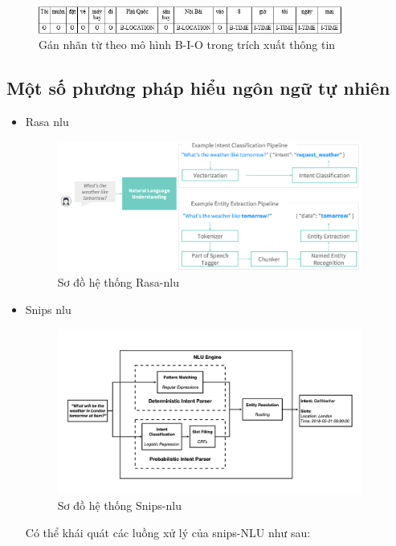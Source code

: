 \begin{figure}[htp]
    \centering
    \includegraphics[width=10cm]{images/Model-BIO.png}
    \caption{Gán nhãn từ theo mô hình B-I-O trong trích xuất thông tin}
    \label{fig:model-BIO}
\end{figure}

\subsection{Một số phương pháp hiểu ngôn ngữ tự nhiên}

\begin{itemize}
    \item Rasa \ac{nlu}
          \begin{figure}[htp]
              \centering
              \includegraphics[width=10cm]{images/Rasa-NLU.png}
              \caption{Sơ đồ hệ thống Rasa-\ac{nlu}}
              \label{fig:rasa-nlu}
          \end{figure}
    \item Snips \ac{nlu}
          \begin{figure}[htp]
              \centering
              \includegraphics[width=10cm]{images/Snips-NLU.png}
              \caption{Sơ đồ hệ thống Snips-\ac{nlu}}
              \label{fig:snips-nlu}
          \end{figure}
          Có thể khái quát các luồng xử lý của snips-NLU \cite{snips-nlu} như sau:

\end{itemize}
